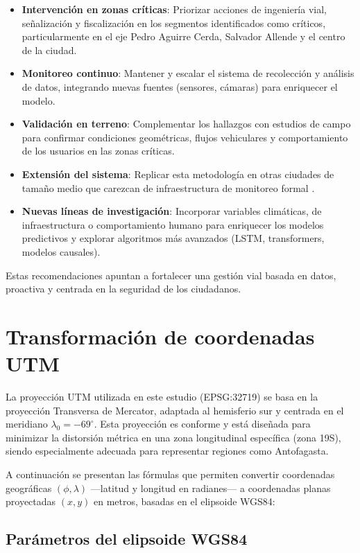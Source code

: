 \documentclass[12pt]{article}
\begin{document}
\begin{itemize}
    \item \textbf{Intervención en zonas críticas}: Priorizar acciones de ingeniería vial, señalización y fiscalización en los segmentos identificados como críticos, particularmente en el eje Pedro Aguirre Cerda, Salvador Allende y el centro de la ciudad.
    \item \textbf{Monitoreo continuo}: Mantener y escalar el sistema de recolección y análisis de datos, integrando nuevas fuentes (sensores, cámaras) para enriquecer el modelo.
    \item \textbf{Validación en terreno}: Complementar los hallazgos con estudios de campo para confirmar condiciones geométricas, flujos vehiculares y comportamiento de los usuarios en las zonas críticas.
    \item \textbf{Extensión del sistema}: Replicar esta metodología en otras ciudades de tamaño medio que carezcan de infraestructura de monitoreo formal \citep{berhanu2024}.
    \item \textbf{Nuevas líneas de investigación}: Incorporar variables climáticas, de infraestructura o comportamiento humano para enriquecer los modelos predictivos y explorar algoritmos más avanzados (LSTM, transformers, modelos causales).
\end{itemize}

Estas recomendaciones apuntan a fortalecer una gestión vial basada en datos, proactiva y centrada en la seguridad de los ciudadanos.

\newpage

\appendix
\section{Transformación de coordenadas UTM}
\label{ap:utm}

La proyección UTM utilizada en este estudio (EPSG:32719) se basa en la proyección Transversa de Mercator, adaptada al hemisferio sur y centrada en el meridiano $\lambda_0 = -69^\circ$. Esta proyección es conforme y está diseñada para minimizar la distorsión métrica en una zona longitudinal específica (zona 19S), siendo especialmente adecuada para representar regiones como Antofagasta.

A continuación se presentan las fórmulas que permiten convertir coordenadas geográficas $(\phi, \lambda)$ —latitud y longitud en radianes— a coordenadas planas proyectadas $(x, y)$ en metros, basadas en el elipsoide WGS84:

\subsection*{Parámetros del elipsoide WGS84}
\end{document}
